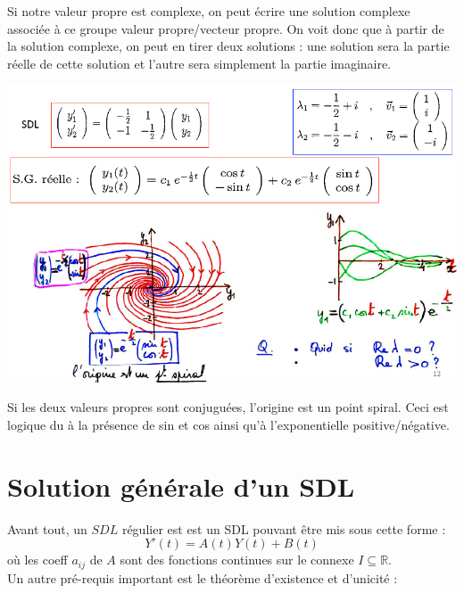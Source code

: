 \documentclass[11pt, a4paper, openany]{book}
\begin{document}
Si notre valeur propre est complexe, on peut écrire une solution complexe associée à ce groupe valeur propre/vecteur propre. On voit donc que à partir de la solution complexe, on peut en tirer deux solutions : une solution sera la partie réelle de cette solution et l'autre sera simplement la partie imaginaire.
\begin{center}
	\includegraphics[scale=0.45]{image5.png}
\end{center}
Si les deux valeurs propres sont conjuguées, l'origine est un point spiral. Ceci est logique du à la présence de sin et cos ainsi qu'à l'exponentielle positive/négative.
		
		
\setcounter{section}{1}
\section{Solution générale d'un SDL}
Avant tout, un $SDL$ régulier est est un SDL pouvant être mis sous cette forme :
\begin{equation}
	Y'(t) = A(t)Y(t) + B(t)
\end{equation}
où les coeff $a_{ij}$ de $A$ sont des fonctions continues sur le connexe $I\subseteq \mathbb{R}$.\\
Un autre pré-requis important est le théorème d'existence et d'unicité :\\
\end{document}
